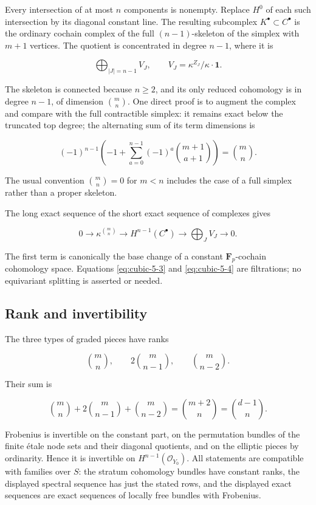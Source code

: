 \documentclass[11pt]{article}
\begin{document}
Every intersection of at most \(n\) components is nonempty. Replace \(H^0\) of each such intersection by its diagonal constant line. The resulting subcomplex \(K^\bullet\subset C^\bullet\) is the ordinary cochain complex of the full \((n-1)\)-skeleton of the simplex with \(m+1\) vertices. The quotient is concentrated in degree \(n-1\), where it is

\[
\bigoplus_{|J|=n-1}V_J,
\qquad V_J=\kappa^{Z_J}/\kappa\cdot\mathbf1.
\]

The skeleton is connected because \(n\ge2\), and its only reduced cohomology is in degree \(n-1\), of dimension \(\binom mn\). One direct proof is to augment the complex and compare with the full contractible simplex: it remains exact below the truncated top degree; the alternating sum of its term dimensions is

\[
(-1)^{n-1}\left(-1+\sum_{a=0}^{n-1}
                      (-1)^a\binom{m+1}{a+1}\right)
=\binom mn.
\]

The usual convention \(\binom mn=0\) for \(m<n\) includes the case of a full simplex rather than a proper skeleton.

The long exact sequence of the short exact sequence of complexes gives

\begin{equation}
0\longrightarrow\kappa^{\binom mn}
\longrightarrow H^{n-1}(C^\bullet)
\longrightarrow\bigoplus_J V_J\longrightarrow0.
\label{eq:cubic-5-4}
\end{equation}

The first term is canonically the base change of a constant \(\mathbf F_p\)-cochain cohomology space. Equations \eqref{eq:cubic-5-3} and \eqref{eq:cubic-5-4} are filtrations; no equivariant splitting is asserted or needed.

\subsection{Rank and invertibility}\label{sec:cubic-cech-rank}

The three types of graded pieces have ranks

\[
\binom mn,\qquad 2\binom m{n-1},\qquad\binom m{n-2}.
\]

Their sum is

\begin{equation}
\binom mn+2\binom m{n-1}+\binom m{n-2}
=\binom{m+2}n=\binom{d-1}n.
\label{eq:cubic-5-5}
\end{equation}

Frobenius is invertible on the constant part, on the permutation bundles of the finite étale node sets and their diagonal quotients, and on the elliptic pieces by ordinarity. Hence it is invertible on \(H^{n-1}(\mathcal O_{Y_0})\). All statements are compatible with families over \(S\): the stratum cohomology bundles have constant ranks, the displayed spectral sequence has just the stated rows, and the displayed exact sequences are exact sequences of locally free bundles with Frobenius.
\end{document}
